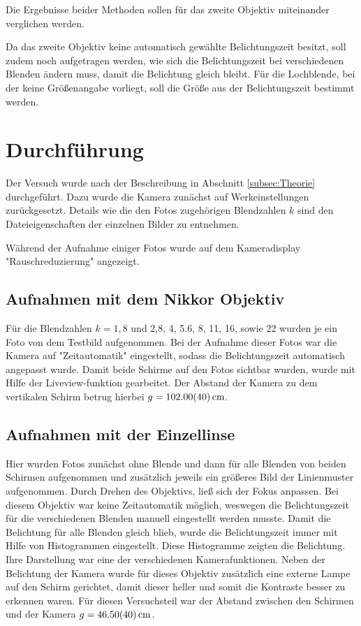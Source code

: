 		Die Ergebnisse beider Methoden sollen für das zweite Objektiv miteinander verglichen werden.
		
		Da das zweite Objektiv keine automatisch gewählte Belichtungszeit besitzt, soll zudem noch aufgetragen werden, wie sich die Belichtungszeit bei verschiedenen Blenden ändern muss, damit die Belichtung gleich bleibt.
		Für die Lochblende, bei der keine Größenangabe vorliegt, soll die Größe aus der Belichtungszeit bestimmt werden.
		
\section{Durchführung}
	
	Der Versuch wurde nach der Beschreibung in Abschnitt \ref{subsec:Theorie} durchgeführt.
	Dazu wurde die Kamera zunächst auf Werkeinstellungen zurückgesetzt. 
	Details wie die den Fotos zugehörigen Blendzahlen $k$ sind den Dateieigenschaften der einzelnen Bilder zu entnehmen.
	
	Während der Aufnahme einiger Fotos wurde auf dem Kameradisplay "Rauschreduzierung" angezeigt.
	
	\subsection{Aufnahmen mit dem Nikkor Objektiv}
		
		Für die Blendzahlen $k=1,8$ und 2,8, 4, 5.6, 8, 11, 16, sowie 22 wurden je ein Foto von dem Testbild aufgenommen.
		Bei der Aufnahme dieser Fotos war die Kamera auf "Zeitautomatik" eingestellt, sodass die Belichtungszeit automatisch angepasst wurde.
		Damit beide Schirme auf den Fotos sichtbar wurden, wurde mit Hilfe der Liveview-funktion gearbeitet.
		Der Abstand der Kamera zu dem vertikalen Schirm betrug hierbei $g = \SI{102+-0,40}{\centi\meter}$.
		
	\subsection{Aufnahmen mit der Einzellinse}
	
		Hier wurden Fotos zunächst ohne Blende und dann für alle Blenden von beiden Schirmen aufgenommen und zusätzlich jeweils ein größeres Bild der Linienmuster aufgenommen.
		Durch Drehen des Objektivs, ließ sich der Fokus anpassen.
		Bei diesem Objektiv war keine Zeitautomatik möglich, weswegen die Belichtungszeit für die verschiedenen Blenden manuell eingestellt werden musste.
		Damit die Belichtung für alle Blenden gleich blieb, wurde die Belichtungszeit immer mit Hilfe von Histogrammen eingestellt.
		Diese Histogramme zeigten die Belichtung.
		Ihre Darstellung war eine der verschiedenen Kamerafunktionen.
		Neben der Belichtung der Kamera wurde für dieses Objektiv zusätzlich eine externe Lampe auf den Schirm gerichtet, damit dieser heller und somit die Kontraste besser zu erkennen waren. 
		Für diesen Versuchsteil war der Abstand zwischen den Schirmen und der Kamera $g = \SI{46,5+-0,40}{\centi\meter}$.
		
